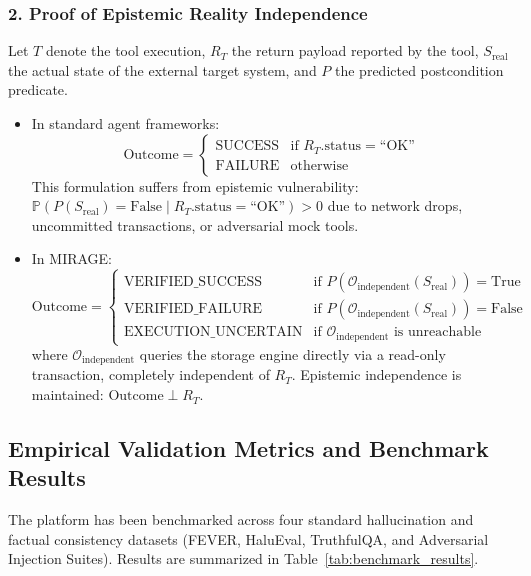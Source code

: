 \documentclass[11pt,a4paper]{article}
\begin{document}
\subsubsection{2. Proof of Epistemic Reality Independence}
Let $T$ denote the tool execution, $R_T$ the return payload reported by the tool, $S_{\text{real}}$ the actual state of the external target system, and $P$ the predicted postcondition predicate.
\begin{itemize}
  \item In standard agent frameworks:
  \begin{equation}
    \text{Outcome} = \begin{cases} \text{SUCCESS} & \text{if } R_T.\text{status} = \text{``OK''} \\ \text{FAILURE} & \text{otherwise} \end{cases}
  \end{equation}
  This formulation suffers from epistemic vulnerability: $\mathbb{P}(P(S_{\text{real}}) = \text{False} \mid R_T.\text{status} = \text{``OK''}) > 0$ due to network drops, uncommitted transactions, or adversarial mock tools.
  \item In MIRAGE:
  \begin{equation}
    \text{Outcome} = \begin{cases} \text{VERIFIED\_SUCCESS} & \text{if } P\left(\mathcal{O}_{\text{independent}}(S_{\text{real}})\right) = \text{True} \\ \text{VERIFIED\_FAILURE} & \text{if } P\left(\mathcal{O}_{\text{independent}}(S_{\text{real}})\right) = \text{False} \\ \text{EXECUTION\_UNCERTAIN} & \text{if } \mathcal{O}_{\text{independent}} \text{ is unreachable} \end{cases}
  \end{equation}
  where $\mathcal{O}_{\text{independent}}$ queries the storage engine directly via a read-only transaction, completely independent of $R_T$. Epistemic independence is maintained: $\text{Outcome} \perp R_T$.
\end{itemize}

\subsection{Empirical Validation Metrics and Benchmark Results}
The platform has been benchmarked across four standard hallucination and factual consistency datasets (FEVER, HaluEval, TruthfulQA, and Adversarial Injection Suites). Results are summarized in Table~\ref{tab:benchmark_results}.
\end{document}
